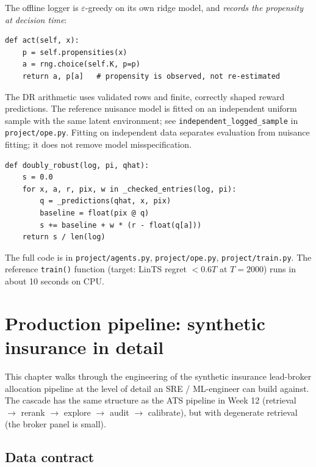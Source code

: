 \documentclass[11pt,oneside]{scrbook}
\begin{document}
The offline logger is $\varepsilon$-greedy on its own ridge model, and
\emph{records the propensity at decision time}:

\begin{verbatim}
def act(self, x):
    p = self.propensities(x)
    a = rng.choice(self.K, p=p)
    return a, p[a]   # propensity is observed, not re-estimated
\end{verbatim}

The DR arithmetic uses validated rows and finite, correctly shaped reward
predictions. The reference nuisance model is fitted on an independent uniform
sample with the same latent environment; see
\texttt{independent\_logged\_sample} in \texttt{project/ope.py}. Fitting on
independent data separates evaluation from nuisance fitting; it does not
remove model misspecification.

\begin{verbatim}
def doubly_robust(log, pi, qhat):
    s = 0.0
    for x, a, r, pix, w in _checked_entries(log, pi):
        q = _predictions(qhat, x, pix)
        baseline = float(pix @ q)
        s += baseline + w * (r - float(q[a]))
    return s / len(log)
\end{verbatim}

The full code is in \texttt{project/agents.py}, \texttt{project/ope.py},
\texttt{project/train.py}. The reference \texttt{train()} function (target:
LinTS regret $<0.6T$ at $T=2000$) runs in about 10 seconds on CPU.

\chapter{Production pipeline: synthetic insurance in detail}

This chapter walks through the engineering of the synthetic insurance lead-broker
allocation pipeline at the level of detail an SRE / ML-engineer can build
against. The cascade has the same structure as the ATS pipeline in Week
12 (retrieval $\to$ rerank $\to$ explore $\to$ audit $\to$ calibrate), but
with degenerate retrieval (the broker panel is small).

\section{Data contract}
\end{document}
